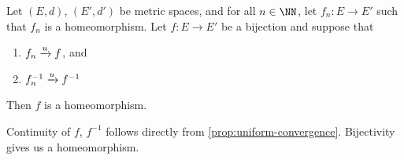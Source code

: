 \begin{corollary}\label{cor:uniformly-convergent-homeomorphisms}
  Let $(E, d)$, $(E', d')$ be metric spaces, and for all $n \in \NN$,
  let $f_n : E \to E'$ such that $f_n$ is a homeomorphism. Let $f : E
  \to E'$ be a bijection and suppose that
  \begin{enumerate}
    \item $f_n \xrightarrow{u} f$, and
    \item $f^{-1}_n \xrightarrow{u} f^{-1}$
  \end{enumerate}
  Then $f$ is a homeomorphism.
\end{corollary}
\begin{sproof}
  Continuity of $f$, $f^{-1}$ follows directly from
  \cref{prop:uniform-convergence}. Bijectivity gives us a
  homeomorphism.
\end{sproof}







